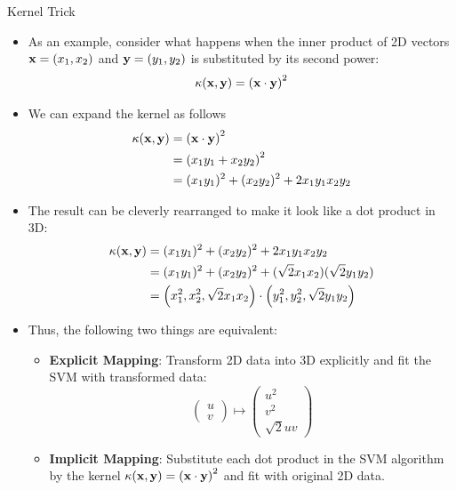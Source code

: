 \documentclass[10pt, aspectratio=169]{beamer} %
\newcommand{\x}{{\bf x}}
\newcommand{\y}{{\bf y}}
\begin{document}
\begin{frame}[fragile,allowframebreaks=0.8]
 {Kernel Trick}
\begin{itemize}
\item As an example, consider what happens when the inner product of 2D vectors $\x = (x_1,x_2)$ and $\y = (y_1, y_2)$ is substituted by
its second power:
\[
\kappa(\x, \y) = \left(\x \cdot \y \right)^2
\]
\item We can expand the kernel as follows
\begin{align*}
\kappa(\x, \y) &= \left(\x \cdot \y \right)^2\\
&= \left(x_1y_1 + x_2y_2\right)^2\\
&= (x_1y_1)^2 + (x_2y_2)^2 + 2x_1y_1x_2y_2
\end{align*}
\item The result can be cleverly rearranged to make it look like a dot product in 3D:
\begin{align*}
\kappa(\x, \y) &= (x_1y_1)^2 + (x_2y_2)^2 + 2x_1y_1x_2y_2\\
&= (x_1y_1)^2 + (x_2y_2)^2 + (\sqrt{2}x_1x_2)(\sqrt{2}y_1y_2)\\
&= \left(x_1^2, x_2^2, \sqrt{2}x_1x_2\right) \cdot \left(y_1^2, y_2^2, \sqrt{2}y_1y_2\right)
\end{align*}
\eject
\item Thus, the following two things are equivalent:
\begin{itemize}
\item \textbf{Explicit Mapping}: Transform 2D data into 3D explicitly and fit the SVM with transformed data:
\[
\begin{pmatrix}
u \\ v
\end{pmatrix}
\mapsto 
\begin{pmatrix}
u^2\\
v^2\\
\sqrt{2}u v
\end{pmatrix}
\]
\item \textbf{Implicit Mapping}: Substitute each dot product in the SVM algorithm by the
kernel $\kappa(\x, \y) = \left(\x \cdot \y \right)^2$ and fit with original 2D data.
\end{itemize}
\end{itemize}
\end{frame}
\end{document}
